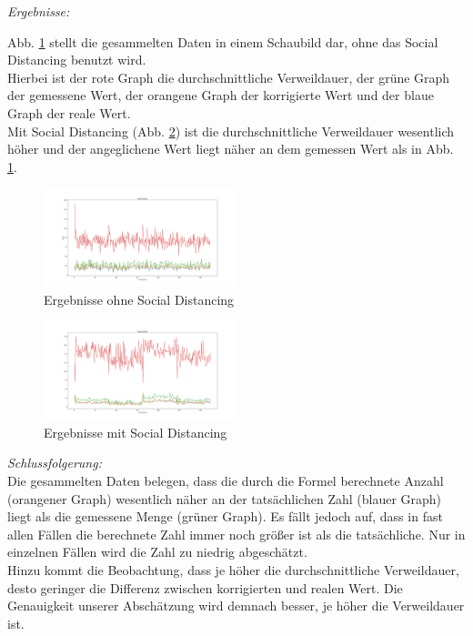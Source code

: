 \documentclass[conference]{IEEEtran}
\begin{document}

\textit{Ergebnisse:}

Abb. \ref{mast_data_plotted_old} stellt die gesammelten Daten in einem Schaubild dar, ohne das Social Distancing benutzt wird.\\
Hierbei ist der rote Graph die durchschnittliche Verweildauer, der grüne Graph der gemessene Wert, der orangene Graph der korrigierte Wert und der blaue Graph der reale Wert.\\
Mit Social Distancing (Abb. \ref{mast_data_plotted_social_distancing_old}) ist die durchschnittliche Verweildauer wesentlich höher und der angeglichene Wert liegt näher an dem gemessen Wert als in Abb. \ref{mast_data_plotted_old}.

\begin{figure}[h]
	\centering
	\includegraphics[width=0.5\textwidth]{"Mast_Data_Plotted_old"}
	\caption{Ergebnisse ohne Social Distancing}
	\label{mast_data_plotted_old}
\end{figure}

\begin{figure}[h]
	\centering
	\includegraphics[width=0.5\textwidth]{"Mast_Data_Plotted_Social_Distancing_old"}
	\caption{Ergebnisse mit Social Distancing}
	\label{mast_data_plotted_social_distancing_old}
\end{figure}

\textit{Schlussfolgerung:}\\
Die gesammelten Daten belegen, dass die durch die Formel berechnete Anzahl (orangener Graph) wesentlich näher an der tatsächlichen Zahl (blauer Graph) liegt als die gemessene Menge (grüner Graph). Es fällt jedoch auf, dass in fast allen Fällen die berechnete Zahl immer noch größer ist als die tatsächliche. Nur in einzelnen Fällen wird die Zahl zu niedrig abgeschätzt.\\
Hinzu kommt die Beobachtung, dass je höher die durchschnittliche Verweildauer, desto geringer die Differenz zwischen korrigierten und realen Wert. Die Genauigkeit unserer Abschätzung wird demnach besser, je höher die Verweildauer ist.\\
\end{document}
